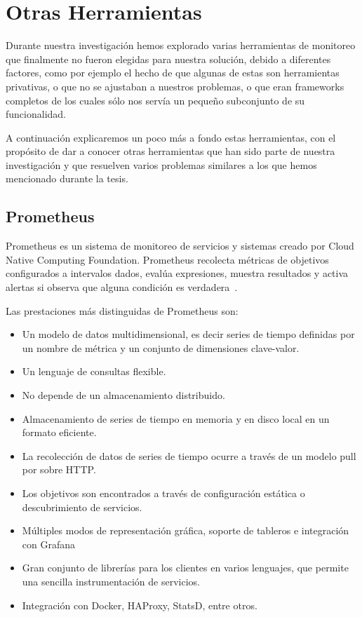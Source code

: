 \section{Otras Herramientas}
\label{anexo:B}

Durante nuestra investigación hemos explorado varias herramientas de monitoreo
que finalmente no fueron elegidas para nuestra solución, debido a diferentes
factores, como por ejemplo el hecho de que algunas de estas son herramientas
privativas, o que no se ajustaban a nuestros problemas, o que eran frameworks
completos de los cuales sólo nos servía un pequeño subconjunto de su
funcionalidad.

A continuación explicaremos un poco más a fondo estas herramientas, con el
propósito de dar a conocer otras herramientas que han sido parte de nuestra
investigación y que resuelven varios problemas similares a los que hemos
mencionado durante la tesis.

\subsection{Prometheus}

Prometheus es un sistema de monitoreo de servicios y sistemas creado por Cloud
Native Computing Foundation. Prometheus recolecta métricas de objetivos
configurados a intervalos dados, evalúa expresiones, muestra resultados y
activa alertas si observa que alguna condición es verdadera~\cite{prometheus}.

Las prestaciones más distinguidas de Prometheus son:

\begin{itemize}
  \item Un modelo de datos multidimensional, es decir series de tiempo
    definidas por un nombre de métrica y un conjunto de dimensiones
    clave-valor.
  \item Un lenguaje de consultas flexible.
  \item No depende de un almacenamiento distribuido.
  \item Almacenamiento de series de tiempo en memoria y en disco local en un
    formato eficiente.
  \item La recolección de datos de series de tiempo ocurre a través de un
    modelo pull por sobre HTTP.
  \item Los objetivos son encontrados a través de configuración estática o
    descubrimiento de servicios.
  \item Múltiples modos de representación gráfica, soporte de tableros e
    integración con Grafana
  \item Gran conjunto de librerías para los clientes en varios lenguajes, que
    permite una sencilla instrumentación de servicios.
  \item Integración con Docker, HAProxy, StatsD, entre otros.
\end{itemize}

